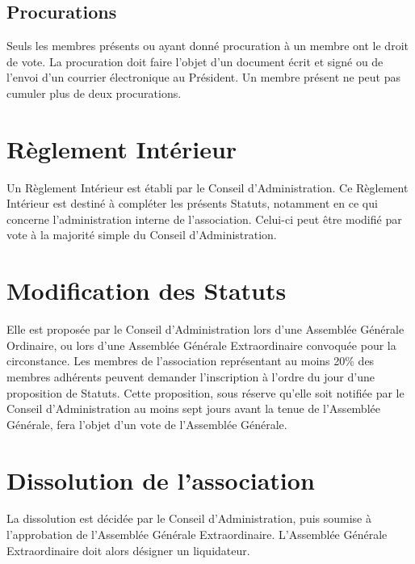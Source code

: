 \documentclass[12pt]{article}
\begin{document}
\subsection{Procurations}
\label{sec:ago:procurations}
Seuls les membres présents ou ayant donné procuration à un membre ont le droit de vote. La procuration doit
faire l’objet d’un document écrit et signé ou de l’envoi d’un courrier électronique au Président. Un membre
présent ne peut pas cumuler plus de deux procurations.

\section{Règlement Intérieur}
\label{sec:ago:reglement}

Un Règlement Intérieur est établi par le Conseil d’Administration.
Ce Règlement Intérieur est destiné à compléter les présents Statuts, notamment en ce qui concerne
l’administration interne de l’association.
Celui-ci peut être modifié par vote à la majorité simple du Conseil d’Administration.

\section{Modification des Statuts}
\label{sec:ago:statuts}
Elle est proposée par le Conseil d’Administration lors d’une Assemblée Générale Ordinaire, ou lors d’une
Assemblée Générale Extraordinaire convoquée pour la circonstance.
Les membres de l’association représentant au moins 20\% des membres adhérents peuvent demander
l’inscription à l’ordre du jour d’une proposition de Statuts.
Cette proposition, sous réserve qu’elle soit notifiée par le Conseil d’Administration au moins sept jours avant
la tenue de l’Assemblée Générale, fera l’objet d’un vote de l’Assemblée Générale.

\section{Dissolution de l’association}
\label{sec:ago:dissolution}

La dissolution est décidée par le Conseil d’Administration, puis soumise à l’approbation de l’Assemblée
Générale Extraordinaire.
L’Assemblée Générale Extraordinaire doit alors désigner un liquidateur.
\end{document}
